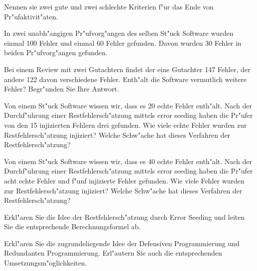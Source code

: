 \documentclass[12pt]{exam}
\begin{document}
\begin{questions}
\question[4] Nennen sie zwei gute und zwei schlechte Kriterien f"ur das Ende von Pr"ufaktivit"aten.
\addpoints

\question[5] In zwei unabh"angigen Pr"ufvorg"angen des selben St"uck Software wurden einmal 100 Fehler und einmal 60 Fehler gefunden. Davon wurden 30 Fehler in beiden Pr"ufvorg"angen gefunden.
\noaddpoints
{}

\question[2] Bei einem Review mit zwei Gutachtern findet der eine Gutachter 147 Fehler, der andere 122 davon verschiedene Fehler. Enth"alt die Software vermutlich weitere Fehler? Begr"unden Sie Ihre Antwort.
\addpoints

\question[5] Von einem St"uck Software wissen wir, dass es 20 echte Fehler enth"alt. Nach der Durchf"uhrung einer Restfehlersch"atzung mittels error seeding haben die Pr"ufer von den 15 injizierten Fehlern drei gefunden. Wie viele echte Fehler wurden zur Restfehlersch"atzung injiziert? Welche Schw"ache hat dieses Verfahren der Restfehlersch"atzung?
\addpoints

\question[5] Von einem St"uck Software wissen wir, dass es 40 echte Fehler enth"alt. Nach der Durchf"uhrung einer Restfehlersch"atzung mittels error seeding haben die Pr"ufer acht echte Fehler und f"unf injizierte Fehler gefunden. Wie viele Fehler wurden zur Restfehlersch"atzung injiziert? Welche Schw"ache hat dieses Verfahren der Restfehlersch"atzung?
\addpoints

\question[3] Erkl"aren Sie die Idee der Restfehlersch"atzung durch Error Seeding und leiten Sie die entsprechende Berechnungsformel ab.
\addpoints

\question[4] Erkl"aren Sie die zugrundeliegende Idee der Defensiven Programmierung und Redundanten Programmierung. Erl"autern Sie auch die entsprechenden Umsetzungsm"oglichkeiten.
\addpoints


\end{questions}
\end{document}
